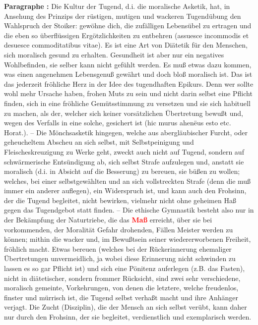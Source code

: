 \documentclass[a4paper,12pt,twoside]{book}
\newcommand{\match}[1]{\textcolor{red}{\textbf{#1}}}
\begin{document}
	\textbf{Paragraphe : }Die Kultur der Tugend, d.i. die moralische Asketik, hat, in Ansehung des Prinzips der rüstigen, mutigen und wackeren Tugendübung den Wahlspruch der Stoiker: gewöhne dich, die zufälligen Lebensübel zu ertragen und die eben so überflüssigen Ergötzlichkeiten zu entbehren (assuesce incommodis et desuesce commoditatibus vitae). Es ist eine Art von Diätetik für den Menschen, sich moralisch gesund zu erhalten. Gesundheit ist aber nur ein negatives  Wohlbefinden, sie selber kann nicht gefühlt werden. Es muß etwas dazu kommen, was einen angenehmen Lebensgenuß gewährt und doch bloß moralisch ist. Das ist das jederzeit fröhliche Herz in der Idee des tugendhaften Epikurs. Denn wer sollte wohl mehr Ursache haben, frohen Muts zu sein und nicht darin selbst eine Pflicht finden, sich in eine fröhliche Gemütsstimmung zu versetzen und sie sich habituell zu machen, als der, welcher sich keiner vorsätzlichen Übertretung bewußt und, wegen des Verfalls in eine solche, gesichert ist (hic murus ahenëus esto etc. Horat.). – Die Mönchsasketik hingegen, welche aus abergläubischer Furcht, oder geheucheltem Abscheu an sich selbst, mit Selbstpeinigung und Fleischeskreuzigung zu Werke geht, zweckt auch nicht auf Tugend, sondern auf schwärmerische Entsündigung ab, sich selbst Strafe aufzulegen und, anstatt sie moralisch (d.i. in Absicht auf die Besserung) zu bereuen, sie büßen zu wollen; welches, bei einer selbstgewählten und an sich vollstreckten Strafe (denn die muß immer ein anderer auflegen), ein Widerspruch ist, und kann auch den Frohsinn, der die Tugend begleitet, nicht bewirken, vielmehr nicht ohne geheimen Haß gegen das Tugendgebot statt finden. – Die ethische Gymnastik besteht also nur in der Bekämpfung der Naturtriebe, die das \match{Maß} erreicht, über sie bei vorkommenden, der Moralität Gefahr drohenden, Fällen Meister werden zu können; mithin die wacker und, im Bewußtsein seiner wiedererworbenen Freiheit, fröhlich macht. Etwas bereuen (welches bei der Rückerinnerung ehemaliger Übertretungen unvermeidlich, ja wobei diese Erinnerung nicht schwinden zu lassen es so gar Pflicht ist) und sich eine Pönitenz auferlegen (z.B. das Fasten), nicht in diätetischer, sondern frommer Rücksicht, sind zwei sehr verschiedene, moralisch gemeinte, Vorkehrungen, von denen die letztere, welche freudenlos, finster und mürrisch ist, die Tugend selbst verhaßt macht und ihre Anhänger verjagt. Die Zucht (Disziplin), die der Mensch an sich selbst verübt, kann daher nur durch den Frohsinn, der sie begleitet, verdienstlich und exemplarisch werden. 
	
\end{document}
